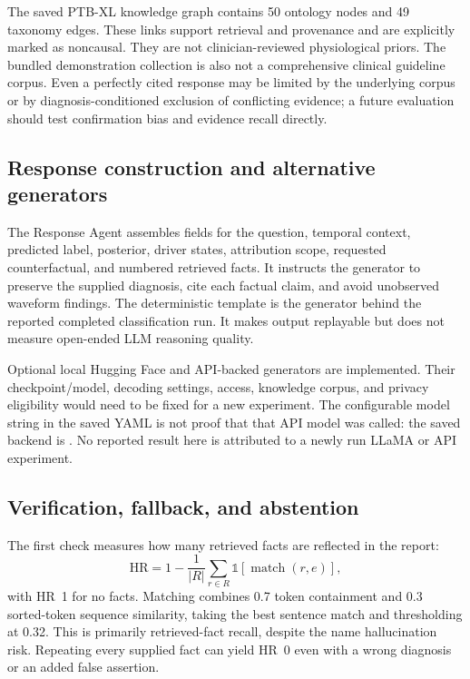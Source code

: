 \documentclass[11pt,a4paper]{article}
\newcommand{\code}[1]{\texttt{\detokenize{#1}}}
\begin{document}
The saved PTB-XL knowledge graph contains 50 ontology nodes and 49 taxonomy edges. These links support retrieval and provenance and are explicitly marked as noncausal. They are not clinician-reviewed physiological priors. The bundled demonstration collection is also not a comprehensive clinical guideline corpus. Even a perfectly cited response may be limited by the underlying corpus or by diagnosis-conditioned exclusion of conflicting evidence; a future evaluation should test confirmation bias and evidence recall directly.

\subsection{Response construction and alternative generators}
The Response Agent assembles fields for the question, temporal context, predicted label, posterior, driver states, attribution scope, requested counterfactual, and numbered retrieved facts. It instructs the generator to preserve the supplied diagnosis, cite each factual claim, and avoid unobserved waveform findings. The deterministic template is the generator behind the reported completed classification run. It makes output replayable but does not measure open-ended LLM reasoning quality.

Optional local Hugging Face and API-backed generators are implemented. Their checkpoint/model, decoding settings, access, knowledge corpus, and privacy eligibility would need to be fixed for a new experiment. The configurable model string in the saved YAML is not proof that that API model was called: the saved backend is \code{template}. No reported result here is attributed to a newly run LLaMA or API experiment.

\subsection{Verification, fallback, and abstention}
The first check measures how many retrieved facts are reflected in the report:
\begin{equation}
\mathrm{HR}=1-\frac{1}{|R|}\sum_{r\in R}\mathbb{1}[\operatorname{match}(r,e)],
\end{equation}
with HR~1 for no facts. Matching combines 0.7 token containment and 0.3 sorted-token sequence similarity, taking the best sentence match and thresholding at 0.32. This is primarily retrieved-fact recall, despite the name hallucination risk. Repeating every supplied fact can yield HR~0 even with a wrong diagnosis or an added false assertion.
\end{document}
